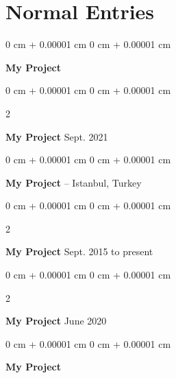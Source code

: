 \documentclass[10pt, letterpaper]{article}
\newenvironment{onecolentry}{
    \begin{adjustwidth}{
        0 cm + 0.00001 cm
    }{
        0 cm + 0.00001 cm
    }
}{
    \end{adjustwidth}
} %
\newenvironment{twocolentry}[2][]{
    \onecolentry
    \def\secondColumn{#2}
    \setcolumnwidth{\fill, 4.5 cm}
    \begin{paracol}{2}
}{
    \switchcolumn \raggedleft \secondColumn
    \end{paracol}
    \endonecolentry
} %
\begin{document}
    
    \section{Normal Entries}



        
        \begin{onecolentry}
            \textbf{My Project}\end{onecolentry}



        \vspace{0.2 cm}

        \begin{twocolentry}{
            Sept. 2021
        }
            \textbf{My Project}\end{twocolentry}



        \vspace{0.2 cm}

        \begin{onecolentry}
            \textbf{My Project} -- Istanbul, Turkey\end{onecolentry}



        \vspace{0.2 cm}

        \begin{twocolentry}{
            Sept. 2015 to present
        }
            \textbf{My Project}\end{twocolentry}



        \vspace{0.2 cm}

        \begin{twocolentry}{
            June 2020
        }
            \textbf{My Project}\end{twocolentry}



        \vspace{0.2 cm}

        \begin{onecolentry}
            \textbf{My Project}\end{onecolentry}
\end{document}
